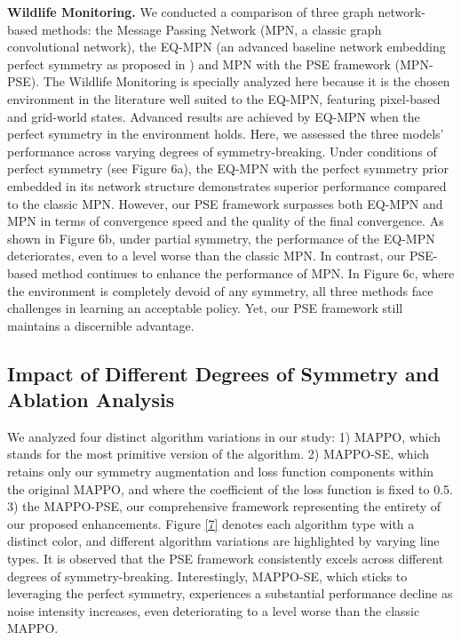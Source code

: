 \documentclass[letterpaper]{article} %
\theoremstyle{definition}
\begin{document}
\textbf{Wildlife Monitoring. } 
We conducted a comparison of three graph network-based methods: the Message Passing Network (MPN, a classic graph convolutional network), the EQ-MPN (an advanced baseline network embedding perfect symmetry as proposed in \cite{vand}) and MPN  with the PSE framework (MPN-PSE). The Wildlife Monitoring is specially analyzed here because it is the chosen environment in the literature well suited to the EQ-MPN, featuring pixel-based and grid-world states. Advanced results are achieved by EQ-MPN when the perfect symmetry in the environment holds. Here, we assessed the three models' performance across varying degrees of symmetry-breaking. Under conditions of perfect symmetry (see Figure 6a), the EQ-MPN with the perfect symmetry prior embedded in its network structure demonstrates superior performance compared to the classic MPN. However, our PSE framework surpasses both EQ-MPN and MPN in terms of convergence speed and the quality of the final convergence. As shown in Figure 6b, under partial symmetry, the performance of the EQ-MPN deteriorates, even to a level worse than the classic MPN. In contrast, our PSE-based method continues to enhance the performance of MPN. In Figure 6c, where the environment is completely devoid of any symmetry, all three methods face challenges in learning an acceptable policy. Yet, our PSE framework still maintains a discernible advantage.


\subsection{Impact of Different Degrees of Symmetry and Ablation Analysis }

We analyzed four distinct algorithm variations in our study: 1) MAPPO, which stands for the most primitive version of the algorithm. 2) MAPPO-SE, which retains only our symmetry augmentation and loss function components within the original MAPPO, and where the coefficient of the loss function is fixed to 0.5. 3) the MAPPO-PSE, our comprehensive framework representing the entirety of our proposed enhancements. Figure \ref{7} denotes each algorithm type with a distinct color, and different algorithm variations are highlighted by varying line types. It is observed that the PSE framework consistently excels across different degrees of symmetry-breaking. Interestingly, MAPPO-SE, which sticks to leveraging the perfect symmetry, experiences a substantial performance decline as noise intensity increases, even deteriorating to a level worse than the classic MAPPO. 
\end{document}
